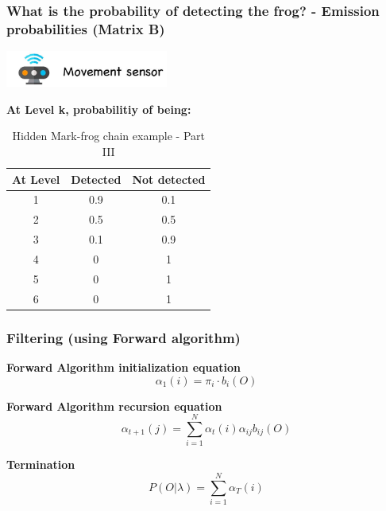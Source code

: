 \documentclass[xcolor=dvipsnames, compress]{beamer}
\begin{document}
\begin{frame}
\frametitle{What is the probability of detecting the frog? - Emission probabilities (Matrix B)}

\begin{center}
\includegraphics[width=0.4\textwidth]{images/sensor.png}
\end{center}

\begin{center}
	\textbf{At Level k, probabilitiy of being:}
\end{center}

\begin{center}
\begin{table}
\begin{centering}
\begin{tabular}{|c|c|c|}
\hline 
At Level & Detected & Not detected\tabularnewline
\hline 
\hline 
1 & 0.9 & 0.1\tabularnewline
\hline 
2 & 0.5 & 0.5\tabularnewline
\hline 
3 & 0.1 & 0.9\tabularnewline
\hline 
4 & 0 & 1\tabularnewline
\hline 
5 & 0 & 1\tabularnewline
\hline 
6 & 0 & 1\tabularnewline
\hline 
\end{tabular}
\par\end{centering}
\caption{Hidden Mark-frog chain example - Part III}
\end{table}
\par\end{center}
\end{frame}
%
%
\begin{frame}
\frametitle{Filtering (using Forward algorithm)}
\textbf{Forward Algorithm initialization equation}
$$ \alpha_{1}(i) = \pi_i \cdot b_{i}(O) $$

\textbf{Forward Algorithm recursion equation}
$$ \alpha_{t+1}(j) = \sum_{i=1}^N \alpha_t(i) \alpha_{ij} b_{ij}(O) $$

\textbf{Termination}
$$ P(O|\lambda) = \sum_{i=1}^N \alpha_T(i)$$
\end{frame}
%
\end{document}
